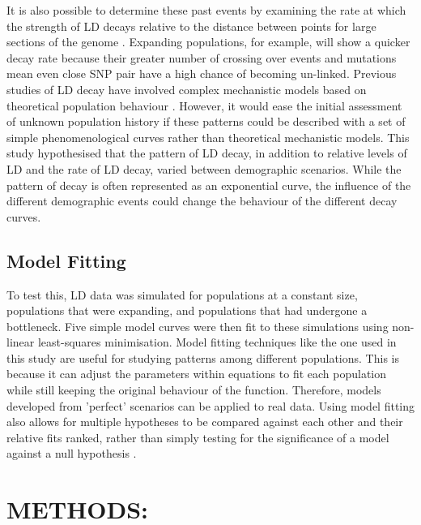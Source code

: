 \documentclass[11pt]{article}
\begin{document}
\begin{linenumbers}
It is also possible to determine these past events by examining the rate at which the strength of LD decays relative to the distance between points for large sections of the genome \citep{hernandez2007demographic, park2012linkage}. Expanding populations, for example, will show a quicker decay rate because their greater number of crossing over events and mutations mean even close SNP pair have a high chance of becoming un-linked. Previous studies of LD decay have involved complex mechanistic models based on theoretical population behaviour \citep{park2012linkage}.  However, it would ease the initial assessment of unknown population history if these patterns could be described with a set of simple phenomenological curves rather than theoretical mechanistic models. This study hypothesised that the pattern of LD decay, in addition to relative levels of LD and the rate of LD decay, varied between demographic scenarios. While the pattern of decay is often represented as an exponential curve, the influence of the different demographic events could change the behaviour of the different decay curves. 

\subsection{Model Fitting}
To test this, LD data was simulated for populations at a constant size, populations that were expanding, and populations that had undergone a bottleneck. Five simple model curves were then fit to these simulations using non-linear least-squares minimisation. Model fitting techniques like the one used in this study are useful for studying patterns among different populations. This is because it can adjust the parameters within equations to fit each population while still keeping the original behaviour of the function. Therefore, models developed from 'perfect' scenarios can be applied to real data. Using model fitting also allows for multiple hypotheses to be compared against each other and their relative fits ranked, rather than simply testing for the significance of a model against a null hypothesis \citep{johnson2004model, gray2009linkage}. 	

\section{METHODS:}


\end{linenumbers}
\end{document}
